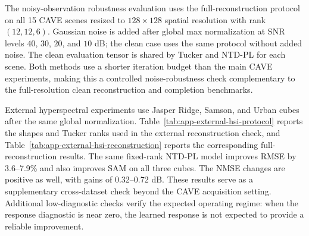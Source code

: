The noisy-observation robustness evaluation uses the full-reconstruction
protocol on all 15 CAVE scenes resized to $128\times128$ spatial resolution
with rank $(12,12,6)$. Gaussian noise is added after global max normalization
at SNR levels $40$, $30$, $20$, and $10$ dB; the clean case uses the same
protocol without added noise. The clean evaluation tensor is shared by Tucker
and NTD-PL for each scene. Both methods use a shorter iteration budget than the
main CAVE experiments, making this a controlled noise-robustness check
complementary to the full-resolution clean reconstruction and completion
benchmarks.

\begin{table}[!t]
  \centering
  \caption{CAVE noisy-observation reconstruction. Models are fitted to clean or
  noisy full observations, and metrics are computed against the clean tensor;
  gains are relative error reductions over matched-rank Tucker.}
  \label{tab:app-cave-noise-robustness}
  \scriptsize
  
\end{table}

External hyperspectral experiments use Jasper Ridge, Samson, and Urban cubes
after the same global normalization. Table~\ref{tab:app-external-hsi-protocol}
reports the shapes and Tucker ranks used in the external reconstruction
check, and Table~\ref{tab:app-external-hsi-reconstruction} reports the
corresponding full-reconstruction results. The same fixed-rank NTD-PL model
improves RMSE by 3.6--7.9\% and also improves SAM on all three cubes. The NMSE
changes are positive as well, with gains of 0.32--0.72 dB. These results serve
as a supplementary cross-dataset check beyond the CAVE acquisition setting.
Additional low-diagnostic checks verify the expected operating regime: when the
response diagnostic is near zero, the learned response is not expected to
provide a reliable improvement.

\begin{table}[!t]
  \centering
  \caption{External hyperspectral reconstruction protocol. Tucker and NTD-PL
  use the same Tucker rank on each cube.}
  \label{tab:app-external-hsi-protocol}
  \scriptsize
  \resizebox{\linewidth}{!}{}
\end{table}

\begin{table}[!t]
  \centering
  \caption{External hyperspectral reconstruction. NTD-PL uses the same Tucker
  rank as the Tucker baseline and adds only the polynomial response
  coefficients.}
  \label{tab:app-external-hsi-reconstruction}
  \scriptsize
  \resizebox{\linewidth}{!}{}
\end{table}

